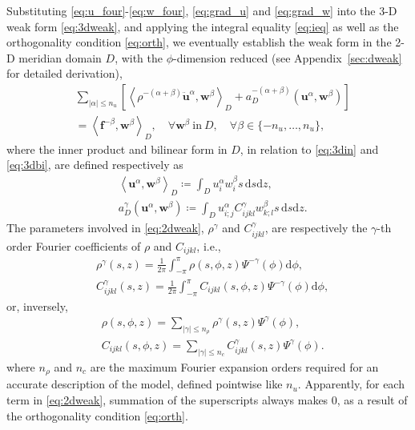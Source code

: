 \documentclass[extra,referee]{gji}
\begin{document}
Substituting \eqref{eq:u_four}-\eqref{eq:w_four}, \eqref{eq:grad_u} and 
\eqref{eq:grad_w} into the 3-D weak form \eqref{eq:3dweak}, and 
applying the integral equality \eqref{eq:ieq} as well as the orthogonality condition
\eqref{eq:orth}, we eventually establish the weak form in the 2-D meridian 
domain $D$, with the $\phi$-dimension reduced (see 
Appendix~\ref{sec:dweak} for detailed derivation),
\begin{equation}
  \begin{alignedat}{1}
    & \sum_{|\alpha|\le n_u} \left[ 
    \left\langle \rho^{-\left(\alpha+\beta\right)}
    \ddot{\mathbf{u}}^\alpha,\mathbf{w}^\beta \right\rangle _{D}
    + a_D^{-\left(\alpha+\beta\right)}
    \left(\mathbf{u}^\alpha,\mathbf{w}^\beta\right)\right] \\&= 
    \left\langle \mathbf{f}^{-\beta},\mathbf{w}^\beta \right\rangle _{D},\quad
    \forall \mathbf{w}^\beta\ \text{in}\ D, \quad 
    \forall \beta\in \{-n_u,\dots,n_u\},
  \end{alignedat}
\label{eq:2dweak}
\end{equation}
where the inner product and bilinear form in $D$, in relation to 
\eqref{eq:3din} and \eqref{eq:3dbi}, are defined respectively as 
\begin{align}
  & \left\langle \mathbf{u}^\alpha,\mathbf{w}^\beta\right\rangle _{D}
  \coloneqq \int_D u_i^\alpha w_i^\beta s\,\text{d}s\text{d}z, \\[.5em]
  & a_D^\gamma \left(\mathbf{u}^\alpha,\mathbf{w}^\beta\right)\coloneqq
  \int_D u_{i;j}^\alpha C_{ijkl}^\gamma w_{k;l}^\beta s\,\text{d}s\text{d}z.
  \label{eq:bi}
\end{align}
The parameters involved in \eqref{eq:2dweak},
$\rho^\gamma$ and $C_{ijkl}^\gamma$, are respectively
the $\gamma$-th order Fourier coefficients of $\rho$ and $C_{ijkl}$, i.e.,
\begin{align}
  & \rho^\gamma\left(s,z\right)=
  \frac{1}{2\pi}\int_{-\pi}^{\pi}\rho\left(s,\phi,z\right)\Psi^{-\gamma}\left(\phi\right)\text{d}\phi,
  \label{eq:four_rho} \\[.5em]
  & C_{ijkl}^\gamma\left(s,z\right)=
  \frac{1}{2\pi}\int_{-\pi}^{\pi}C_{ijkl}\left(s,\phi,z\right)\Psi^{-\gamma}\left(\phi\right)\text{d}\phi,
  \label{eq:four_c}
\end{align}
or, inversely,
\begin{align}
  & \rho\left(s,\phi,z\right)=\sum_{|\gamma|\le n_\rho} 
  \rho^\gamma\left(s,z\right) \Psi^{\gamma}\left(\phi\right),
  \label{eq:ifour_rho} \\[.5em]
  & C_{ijkl}\left(s,\phi,z\right)=\sum_{|\gamma|\le n_c} 
  C_{ijkl}^\gamma\left(s,z\right) \Psi^{\gamma}\left(\phi\right).
  \label{eq:ifour_c}
\end{align}
where $n_\rho$ and $n_c$ are the maximum Fourier expansion orders 
required for an accurate description of the model, defined pointwise like $n_u$.
Apparently, for each term in \eqref{eq:2dweak}, summation of the 
superscripts always makes 0, as a result of 
the orthogonality condition \eqref{eq:orth}.
\end{document}

